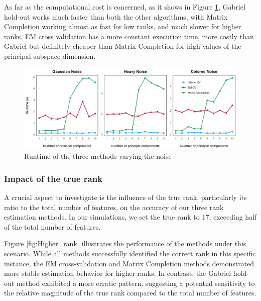 \documentclass{article}
\begin{document}
As far as the computational cost is concerned, as it shows in Figure \ref{fig:Time}, Gabriel hold-out works 
much faster than both the other algorithms, with Matrix Completion working almost as 
fast for low ranks, and much slower for higher ranks. EM cross validation has a more 
constant execution time, more costly than Gabriel but definitely cheaper than Matrix 
Completion for high values of the principal subspace dimension. 


\begin{figure}[h!]
    \centering
    \includegraphics[width=\textwidth]{runtime.png}
    \caption{Runtime of the three methods varying the noise}
    \label{fig:Time}
\end{figure}

\subsubsection{Impact of the true rank}

A crucial aspect to investigate is the influence of the true rank, particularly its ratio to the total number
of features, on the accuracy of our three rank estimation methods. In our simulations, we set the true rank 
to 17, exceeding half of the total number of features.

Figure \ref{fig:Higher_rank} illustrates the performance of the methods under this scenario. While all 
methods successfully identified the correct rank in this specific instance, the EM cross-validation and 
Matrix Completion methods demonstrated more stable estimation behavior for higher ranks. In contrast, the 
Gabriel hold-out method exhibited a more erratic pattern, suggesting a potential sensitivity to the relative 
magnitude of the true rank compared to the total number of features.
\end{document}
